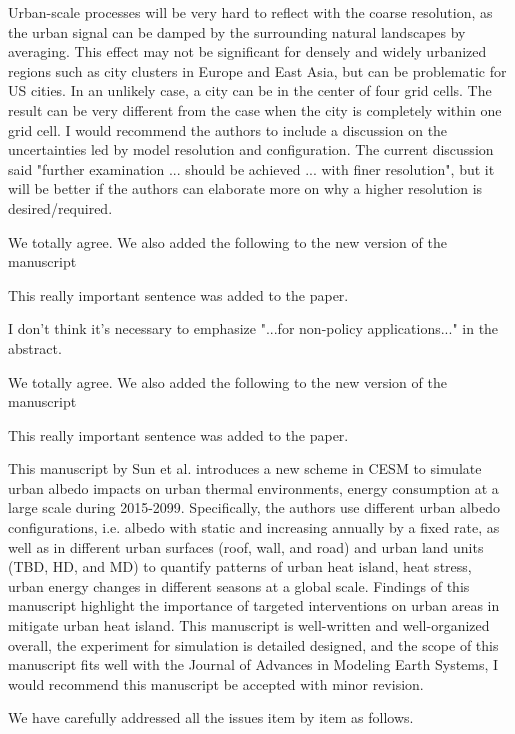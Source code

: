 \documentclass[12pt,american]{scrartcl}
\begin{document}
\begin{revcomment}
	Urban-scale processes will be very hard to reflect with the coarse resolution, as the urban signal can be damped by the surrounding natural landscapes by averaging. This effect may not be significant for densely and widely urbanized regions such as city clusters in Europe and East Asia, but can be problematic for US cities. In an unlikely case, a city can be in the center of four grid cells. The result can be very different from the case when the city is completely within one grid cell. I would recommend the authors to include a discussion on the uncertainties led by model resolution and configuration. The current discussion said "further examination ... should be achieved ... with finer resolution", but it will be better if the authors can elaborate more on why a higher resolution is desired/required.
\end{revcomment}
\begin{revresponse}
	We totally agree. We also added the following to the new version of the manuscript
	\begin{changes}
		This really important sentence was added to the paper.
	\end{changes}
\end{revresponse}

\begin{revcomment}
	I don't think it's necessary to emphasize "...for non-policy applications..." in the abstract.
\end{revcomment}
\begin{revresponse}
	We totally agree. We also added the following to the new version of the manuscript
	\begin{changes}
		This really important sentence was added to the paper.
	\end{changes}
\end{revresponse}

\reviewer
\begin{generalcomment}
This manuscript by Sun et al. introduces a new scheme in CESM to simulate urban albedo impacts on urban thermal environments, energy consumption at a large scale during 2015-2099. Specifically, the authors use different urban albedo configurations, i.e. albedo with static and increasing annually by a fixed rate, as well as in different urban surfaces (roof, wall, and road) and urban land units (TBD, HD, and MD) to quantify patterns of urban heat island, heat stress, urban energy changes in different seasons at a global scale. Findings of this manuscript highlight the importance of targeted interventions on urban areas in mitigate urban heat island. This manuscript is well-written and well-organized overall, the experiment for simulation is detailed designed, and the scope of this manuscript fits well with the Journal of Advances in Modeling Earth Systems, I would recommend this manuscript be accepted with minor revision.
\end{generalcomment}
\begin{revresponse}
	We have carefully addressed all the issues item by item as follows.
\end{revresponse}
\end{document}
